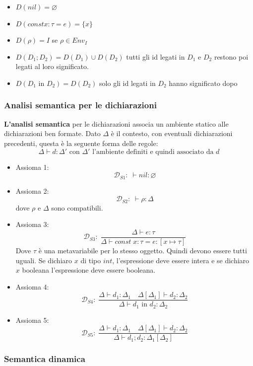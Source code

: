 \documentclass[a4paper]{article}
\begin{document}
\begin{itemize}
  \item $D(nil) = \varnothing$ 
  \item $D(const x : \tau = e) = \{x\}$
  \item $D(\rho) = I$ se $\rho \in Env_I$
  \item $D(D_1 ; D_2) = D(D_1) \cup D(D_2)$ tutti gli id legati in $D_1$ e $D_2$ 
  restono poi legati al loro significato.
  \item $D(D_1 \text{ in } D_2) = D(D_2)$ solo gli id legati in $D_2$ hanno significato dopo
\end{itemize}

\subsubsection{Analisi semantica per le dichiarazioni}

\textbf{L'analisi semantica} per le dichiarazioni associa un ambiente statico 
alle dichiarazioni ben formate. Dato $\Delta$ è il contesto, con eventuali dichiarazioni precedenti,
questa è la seguente forma delle regole:
\[
  \Delta \vdash d : \Delta' \text{ con $\Delta'$ l'ambiente definiti e quindi associato da $d$}
\]
\begin{itemize}
  \item Assioma 1:
  \[
    \mathcal{D}_{S1}: \; \vdash nil : \varnothing
  \]
  \item Assioma 2:
  \[
    \mathcal{D}_{S2}: \; \vdash \rho : \Delta 
  \]
  dove $\rho$ e $\Delta$ sono compatibili.
  \item Assioma 3:
  \[
    \mathcal{D}_{S3}: \; \frac{\Delta \vdash e : \tau}{\Delta \vdash const \; x : \tau = e : [x \mapsto \tau]}
  \]
  Dove $\tau$ è una metavariabile per lo stesso oggetto. Quindi devono essere tutti uguali. 
  Se dichiaro $x$ di tipo $int$, l'espressione deve essere intera e se dichiaro $x$ booleana 
  l'espressione deve essere booleana.
  \item Assioma 4: 
  \[
    \mathcal{D}_{S4}: \; \frac{\Delta \vdash d_1 : \Delta_1 \quad \Delta[\Delta_1] \vdash d_2 : \Delta_2}{\Delta \vdash d_1 \text{ in } d_2 : \Delta_2}
  \]
  \item Assioma 5: 
  \[
    \mathcal{D}_{S5}: \; \frac{\Delta \vdash d_1 : \Delta_1 \quad \Delta[\Delta_1] \vdash d_2 : \Delta_2}{\Delta \vdash d_1 ; d_2 : \Delta_1[\Delta_2]}
  \]
\end{itemize}

\subsubsection{Semantica dinamica} 
\end{document}
